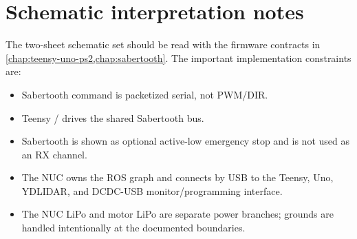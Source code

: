 \section{Schematic interpretation notes}

The two-sheet schematic set should be read with the firmware contracts in \cref{chap:teensy-uno-ps2,chap:sabertooth}.  The important implementation constraints are:

\begin{itemize}
  \item Sabertooth command is packetized serial, not PWM/DIR.
  \item Teensy / drives the shared Sabertooth  bus.
  \item Sabertooth  is shown as optional active-low emergency stop and is not used as an RX channel.
  \item The NUC owns the ROS graph and connects by USB to the Teensy, Uno, YDLIDAR, and DCDC-USB monitor/programming interface.
  \item The NUC LiPo and motor LiPo are separate power branches; grounds are handled intentionally at the documented boundaries.
\end{itemize}
